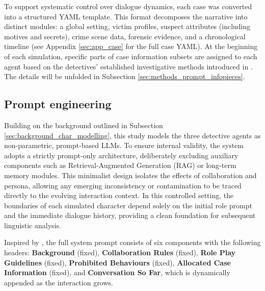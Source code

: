 \documentclass{article}
\begin{document}
To support systematic control over dialogue dynamics, each case was converted into a structured YAML template. This format decomposes the narrative into distinct modules: a global setting, victim profiles, suspect attributes (including motives and secrets), crime scene data, forensic evidence, and a chronological timeline (see Appendix \ref{sec:app_case} for the full case YAML). At the beginning of each simulation, specific parts of case information subsets are assigned to each agent based on the detectives' established investigative methods introduced in \citet{delima2025detective}. The details will be unfolded in Subsection \ref{sec:methods_prompt_infopieces}.


\subsection{Prompt engineering} \label{sec:methods_prompt}

Building on the background outlined in Subsection \ref{sec:background_char_modelling}, this study models the three detective agents as non-parametric, prompt-based LLMs. To ensure internal validity, the system adopts a strictly prompt-only architecture, deliberately excluding auxiliary components such as Retrieval-Augmented Generation (RAG) or long-term memory modules. This minimalist design isolates the effects of collaboration and persona, allowing any emerging inconsistency or contamination to be traced directly to the evolving interaction context. In this controlled setting, the boundaries of each simulated character depend solely on the initial role prompt and the immediate dialogue history, providing a clean foundation for subsequent linguistic analysis.

Inspired by \citet{wu2024jubensha}, the full system prompt consists of six components with the following headers: \textbf{Background} (fixed), \textbf{Collaboration Rules} (fixed), \textbf{Role Play Guidelines} (fixed), \textbf{Prohibited Behaviours} (fixed), \textbf{Allocated Case Information} (fixed), and \textbf{Conversation So Far}, which is dynamically appended as the interaction grows.
\end{document}
